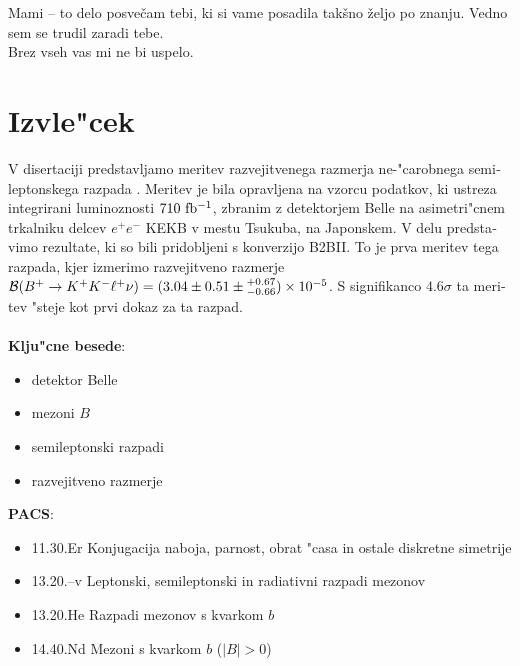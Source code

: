\begin{otherlanguage}{slovene}
\noindent Mami -- to delo posvečam tebi, ki si vame posadila takšno željo po znanju. Vedno sem se trudil zaradi tebe.\\

\hfill Brez vseh vas mi ne bi uspelo.


\pagestyle{empty}


\cleardoublepage
\chapter*{Izvle"cek}
V disertaciji predstavljamo meritev razvejitvenega razmerja ne-"carobnega semileptonskega razpada \decayb. Meritev je bila opravljena na vzorcu podatkov, ki ustreza integrirani luminoznosti $710\mathrm{~fb^{-1}}$, zbranim z detektorjem Belle na asimetri"cnem trkalniku delcev $e^+e^-$ KEKB v mestu Tsukuba, na Japonskem. V delu predstavimo rezultate, ki so bili pridobljeni s konverzijo B2BII. To je prva meritev tega razpada, kjer izmerimo razvejitveno razmerje $\mathcal{B}(B^+ \to K^+ K^- \ell^+ \nu) = (3.04 \pm 0.51 \pm {}^{+0.67}_{-0.66})\times 10^{-5}$. S signifikanco $4.6\sigma$ ta meritev "steje kot prvi dokaz za ta razpad.\\
\vspace{1cm}\\
{{\bf Klju"cne besede}:}
\begin{itemize}
	\item detektor Belle
	\item mezoni $B$
	\item semileptonski razpadi
	\item razvejitveno razmerje
\end{itemize}
\vspace{1cm}
{{\bf PACS}:}
\begin{itemize}
	\item 11.30.Er Konjugacija naboja, parnost, obrat "casa in ostale diskretne simetrije
	\item 13.20.--v Leptonski, semileptonski in radiativni razpadi mezonov
	\item 13.20.He Razpadi mezonov s kvarkom $b$
	\item 14.40.Nd Mezoni s kvarkom $b$ ($|B|>0$) 
\end{itemize}
\end{otherlanguage}

\pagestyle{empty}

\cleardoublepage
\pagestyle{plain}
